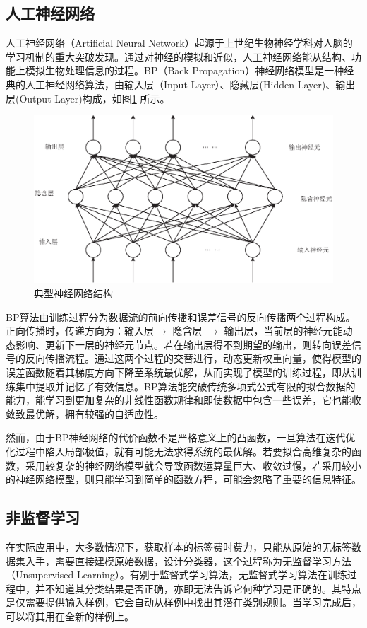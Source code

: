 \documentclass[oneside]{ZJUthesis}
\begin{document}
\subsection{人工神经网络}
人工神经网络（Artificial Neural Network）起源于上世纪生物神经学科对人脑的学习机制的重大突破发现。通过对神经的模拟和近似，人工神经网络能从结构、功能上模拟生物处理信息的过程。BP（Back Propagation）神经网络模型是一种经典的人工神经网络算法，由输入层（Input Layer）、隐藏层(Hidden Layer)、输出层(Output Layer)构成，如图\ref{fig:nn} 所示。
\begin{figure}[H]
\centering
\includegraphics[scale=0.5]{./Pictures/nn.eps}
\caption{典型神经网络结构\label{fig:nn}}
\end{figure}
BP算法由训练过程分为数据流的前向传播和误差信号的反向传播两个过程构成。正向传播时，传递方向为：输入层$\to$ 隐含层 $\to$ 输出层，当前层的神经元能动态影响、更新下一层的神经元节点。若在输出层得不到期望的输出，则转向误差信号的反向传播流程。通过这两个过程的交替进行，动态更新权重向量，使得模型的误差函数随着其梯度方向下降至系统最优解，从而实现了模型的训练过程，即从训练集中提取并记忆了有效信息。BP算法能突破传统多项式公式有限的拟合数据的能力，能学习到更加复杂的非线性函数规律和即使数据中包含一些误差，它也能收敛致最优解，拥有较强的自适应性。

然而，由于BP神经网络的代价函数不是严格意义上的凸函数，一旦算法在迭代优化过程中陷入局部极值，就有可能无法求得系统的最优解。若要拟合高维复杂的函数，采用较复杂的神经网络模型就会导致函数运算量巨大、收敛过慢，若采用较小的神经网络模型，则只能学习到简单的函数方程，可能会忽略了重要的信息特征\cite{1}。


\subsection{非监督学习}
在实际应用中，大多数情况下，获取样本的标签费时费力，只能从原始的无标签数据集入手，需要直接建模原始数据，设计分类器，这个过程称为无监督学习方法（Unsupervised Learning）。有别于监督式学习算法，无监督式学习算法在训练过程中，并不知道其分类结果是否正确，亦即无法告诉它何种学习是正确的。其特点是仅需要提供输入样例，它会自动从样例中找出其潜在类别规则。当学习完成后，可以将其用在全新的样例上。
\end{document}
